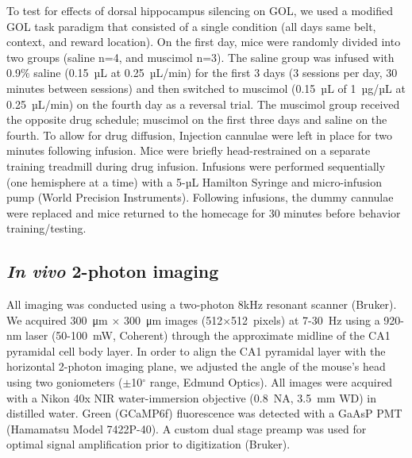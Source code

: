 To test for effects of dorsal hippocampus silencing on GOL, we used a modified GOL task paradigm that consisted of a single condition (all days same belt, context, and reward location). On the first day, mice were randomly divided into two groups (saline n=4, and muscimol n=3). The saline group was infused with 0.9$\%$ saline (0.15~µL at 0.25~µL/min) for the first 3 days (3 sessions per day, 30 minutes between sessions) and then switched to muscimol (0.15~µL of 1~µg/µL at 0.25~µL/min) on the fourth day as a reversal trial. The muscimol group received the opposite drug schedule; muscimol on the first three days and saline on the fourth. To allow for drug diffusion, Injection cannulae were left in place for two minutes following infusion. Mice were briefly head-restrained on a separate training treadmill during drug infusion. Infusions were performed sequentially (one hemisphere at a time) with a 5-µL Hamilton Syringe and micro-infusion pump (World Precision Instruments). Following infusions, the dummy cannulae were replaced and mice returned to the homecage for 30 minutes before behavior training/testing.

\subsection{\emph{In vivo} 2-photon imaging}
All imaging was conducted using a two-photon 8kHz resonant scanner (Bruker). We acquired 300~μm $\times$ 300~μm images (512$\times$512~pixels) at 7-30~Hz using a 920-nm laser (50-100~mW, Coherent) through the approximate midline of the CA1 pyramidal cell body layer.  In order to align the CA1 pyramidal layer with the horizontal 2-photon imaging plane, we adjusted the angle of the mouse's head using two goniometers ($\pm$10$^{\circ}$ range, Edmund Optics).  All images were acquired with a Nikon 40x NIR water-immersion objective (0.8~NA, 3.5~mm WD) in distilled water. Green (GCaMP6f) fluorescence was detected with a GaAsP PMT (Hamamatsu Model 7422P-40). A custom dual stage preamp was used for optimal signal amplification prior to digitization (Bruker). 

